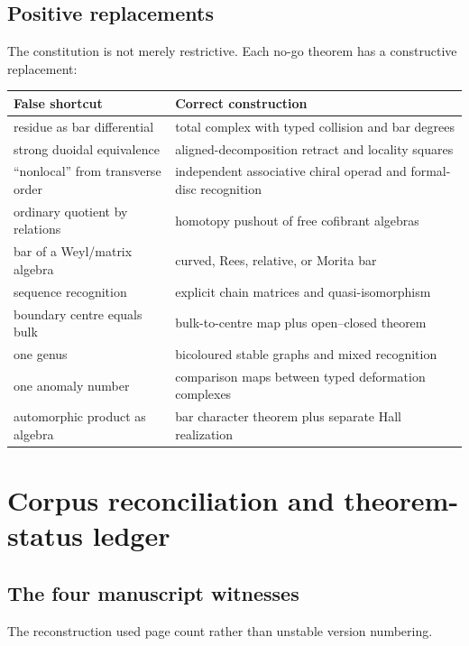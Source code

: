\section{Positive replacements}
The constitution is not merely restrictive.  Each no-go theorem has a constructive replacement:
\begin{center}
\begin{tabularx}{0.96\textwidth}{p{}X}
\toprule
False shortcut & Correct construction\\
\midrule
residue as bar differential & total complex with typed collision and bar degrees\\
strong duoidal equivalence & aligned-decomposition retract and locality squares\\
``nonlocal'' from transverse order & independent associative chiral operad and formal-disc recognition\\
ordinary quotient by relations & homotopy pushout of free cofibrant algebras\\
bar of a Weyl/matrix algebra & curved, Rees, relative, or Morita bar\\
sequence recognition & explicit chain matrices and quasi-isomorphism\\
boundary centre equals bulk & bulk-to-centre map plus open--closed theorem\\
one genus & bicoloured stable graphs and mixed recognition\\
one anomaly number & comparison maps between typed deformation complexes\\
automorphic product as algebra & bar character theorem plus separate Hall realization\\
\bottomrule
\end{tabularx}
\end{center}

\chapter{Corpus reconciliation and theorem-status ledger}\label{chap:corpus}

\section{The four manuscript witnesses}
The reconstruction used page count rather than unstable version numbering.

